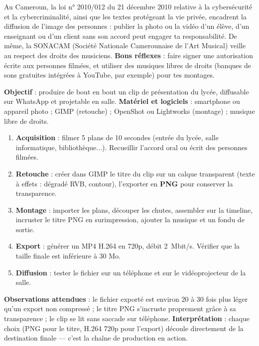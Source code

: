 \documentclass[11pt]{article}
\newcounter{popsec}
\newcounter{popsub}
\newcommand{\courssub}[1]{%
  \stepcounter{popsub}%
  \par\vspace{9pt}\noindent{\popxbold\fontsize{11.5}{13}\selectfont\color{popink}{\color{poporange}\thepopsec.\thepopsub}\hspace{6pt}#1}\par\nopagebreak\vspace{4pt}
}
\begin{document}
\begin{savaistu}
Au Cameroun, la loi n° 2010/012 du 21 décembre 2010 relative à la cybersécurité et la cybercriminalité, ainsi que les textes protégeant la vie privée, encadrent la diffusion de l'image des personnes : publier la photo ou la vidéo d'un élève, d'un enseignant ou d'un client sans son accord peut engager ta responsabilité. De même, la SONACAM (Société Nationale Camerounaise de l'Art Musical) veille au respect des droits des musiciens. \textbf{Bons réflexes} : faire signer une autorisation écrite aux personnes filmées, et utiliser des musiques libres de droits (banques de sons gratuites intégrées à YouTube, par exemple) pour tes montages.
\end{savaistu}

\courssub{Projet guidé et auto-évaluation croisée}

\begin{experience}
\textbf{Objectif} : produire de bout en bout un clip de présentation du lycée, diffusable sur WhatsApp et projetable en salle.
\textbf{Matériel et logiciels} : smartphone ou appareil photo ; GIMP (retouche) ; OpenShot ou Lightworks (montage) ; musique libre de droits.
\begin{enumerate}
\item \textbf{Acquisition} : filmer 5 plans de 10 secondes (entrée du lycée, salle informatique, bibliothèque...). Recueillir l'accord oral ou écrit des personnes filmées.
\item \textbf{Retouche} : créer dans GIMP le titre du clip sur un calque transparent (texte à effets : dégradé RVB, contour), l'exporter en \textbf{PNG} pour conserver la transparence.
\item \textbf{Montage} : importer les plans, découper les chutes, assembler sur la timeline, incruster le titre PNG en surimpression, ajouter la musique et un fondu de sortie.
\item \textbf{Export} : générer un MP4 H.264 en 720p, débit \SI{2}{Mbit/s}. Vérifier que la taille finale est inférieure à 30 Mo.
\item \textbf{Diffusion} : tester le fichier sur un téléphone et sur le vidéoprojecteur de la salle.
\end{enumerate}
\textbf{Observations attendues} : le fichier exporté est environ 20 à 30 fois plus léger qu'un export non compressé ; le titre PNG s'incruste proprement grâce à sa transparence ; le clip se lit sans saccade sur téléphone.
\textbf{Interprétation} : chaque choix (PNG pour le titre, H.264 720p pour l'export) découle directement de la destination finale — c'est la chaîne de production en action.
\end{experience}
\end{document}
